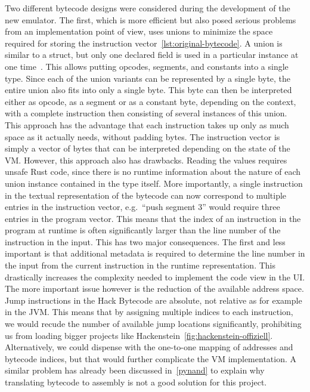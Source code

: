 Two different bytecode designs were considered during the development of the new emulator.
The first, which is more efficient but also posed serious problems from an implementation point of view, uses unions to minimize the space required for storing the instruction vector~\ref{lst:original-bytecode}.
A union is similar to a struct, but only one declared field is used in a particular instance at one time~\cite{klabnik2019rust}. This allows putting opcodes, segments, and constants into a single type.
Since each of the union variants can be represented by a single byte, the entire union also fits into only a single byte. This byte can then be interpreted either as opcode, as a segment or as a constant byte, depending on the context, with a complete instruction then consisting of several instances of this union. This approach has the advantage that each instruction takes up only as much space as it actually needs, without padding bytes. The instruction vector is simply a vector of bytes that can be interpreted depending on the state of the VM.
However, this approach also has drawbacks. Reading the values requires unsafe Rust code, since there is no runtime information about the nature of each union instance contained in the type itself. More importantly, a single instruction in the textual representation of the bytecode can now correspond to multiple entries in the instruction vector, e.g.\ ``push segment 3'' would require three entries in the program vector. This means that the index of an instruction in the program at runtime is often significantly larger than the line number of the instruction in the input.
This has two major consequences. The first and less important is that additional metadata is required to determine the line number in the input from the current instruction in the runtime representation. This drastically increases the complexity needed to implement the code view in the UI.
The more important issue however is the reduction of the available address space. Jump instructions in the Hack Bytecode are absolute, not relative as for example in the JVM.
This means that by assigning multiple indices to each instruction, we would recude the number of available jump locations significantly, prohibiting us from loading bigger projects like Hackenstein~\ref{fig:hackenstein-offiziell}.
Alternatively, we could dispense with the one-to-one mapping of addresses and bytecode indices, but that would further complicate the VM implementation.
A similar problem has already been discussed in~\cref{pynand} to explain why translating bytecode to assembly is not a good solution for this project.

